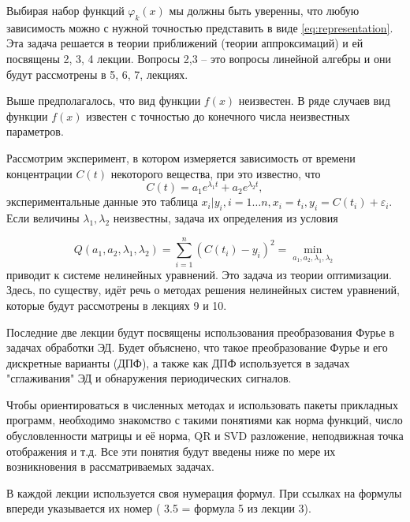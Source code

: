 Выбирая набор функций $\varphi _k(x)$ мы должны быть уверенны, что любую зависимость можно с нужной точностью представить в виде \ref{eq:representation}. Эта задача решается в теории приближений (теории аппроксимаций) и ей посвящены 2, 3, 4 лекции. Вопросы 2,3 -- это вопросы линейной алгебры и они будут рассмотрены в 5, 6, 7, лекциях.

Выше предполагалось, что вид функции $f(x)$ неизвестен. В ряде случаев вид функции  $f(x)$ известен с точностью до конечного числа неизвестных параметров.

Рассмотрим эксперимент, в котором измеряется зависимость от времени концентрации $C(t)$ некоторого вещества, при это известно, что 
\begin{equation}
	C(t) = a_1e^{\lambda_1 t} + a_2 e^{\lambda_2 t},
\end{equation}
экспериментальные данные это таблица $x_i | y_i, i=1\dots n, x_i = t_i, y_i = C(t_i) + \varepsilon_i$. Если величины $\lambda_1, \lambda_2$ неизвестны, задача их определения из условия

 \begin{equation}
	Q(a_1,a_2,\lambda_1, \lambda_2) = \sum^n_{i=1}{(C(t_i) -y_i)^2} = \min_{a_1,a_2,\lambda_1, \lambda_2}
\end{equation}
приводит к системе нелинейных уравнений. Это задача из теории оптимизации. Здесь, по существу, идёт речь о методах решения нелинейных систем уравнений, которые будут рассмотрены в лекциях 9 и 10.

Последние две лекции будут посвящены использования преобразования Фурье в задачах обработки ЭД. Будет объяснено, что такое преобразование Фурье и его дискретные варианты (ДПФ), а также как ДПФ используется в задачах "сглаживания" ЭД и обнаружения периодических сигналов.

Чтобы ориентироваться в численных методах и использовать пакеты прикладных программ, необходимо знакомство с такими понятиями как норма функций, число обусловленности матрицы и её норма, QR и SVD разложение, неподвижная точка отображения и т.д. Все эти понятия будут введены ниже по мере их возникновения в рассматриваемых задачах.

В каждой лекции используется своя нумерация формул. При ссылках на формулы впереди указывается их номер ( 3.5 = формула 5 из лекции 3).


